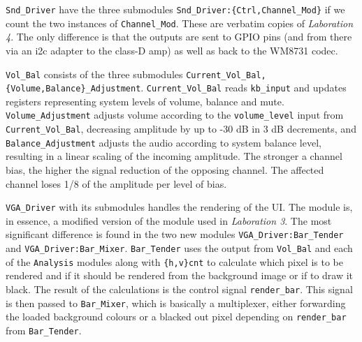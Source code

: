 \texttt{Snd\_Driver} have the three submodules \verb=Snd_Driver:{Ctrl,Channel_Mod}= if we count the two instances of \texttt{Channel\_Mod}. These are verbatim copies of \emph{Laboration 4}. The only difference is that the outputs are sent to GPIO pins (and from there via an i2c adapter to the class-D amp) as well as back to the WM8731 codec.

\texttt{Vol\_Bal} consists of the three submodules \texttt{Current\_Vol\_Bal, \{Volume,Balance\}\_Adjustment}. \verb=Current_Vol_Bal= reads \verb=kb_input= and updates registers representing system levels of volume, balance and mute.
\verb=Volume_Adjustment= adjusts volume according to the \texttt{volume\_level} input from \verb=Current_Vol_Bal=, decreasing amplitude by up to -30 dB in 3 dB decrements, and \verb=Balance_Adjustment= adjusts the audio according to system balance level, resulting in a linear scaling of the incoming amplitude. The stronger a channel bias, the higher the signal reduction of the opposing channel. The affected channel loses 1/8 of the amplitude per level of bias.

\texttt{VGA\_Driver} with its submodules handles the rendering of the UI. The module is, in essence, a modified version of the module used in \emph{Laboration 3}. The most significant difference is found in the two new modules \verb=VGA_Driver:Bar_Tender= and \verb=VGA_Driver:Bar_Mixer=. \verb=Bar_Tender= uses the output from \verb=Vol_Bal= and each of the \verb=Analysis= modules along with \verb={h,v}cnt= to calculate which pixel is to be rendered and if it should be rendered from the background image or if to draw it black. The result of the calculations is the control signal \verb=render_bar=. This signal is then passed to \verb=Bar_Mixer=, which is basically a multiplexer, either forwarding the loaded background colours or a blacked out pixel depending on \verb=render_bar= from \verb=Bar_Tender=.

